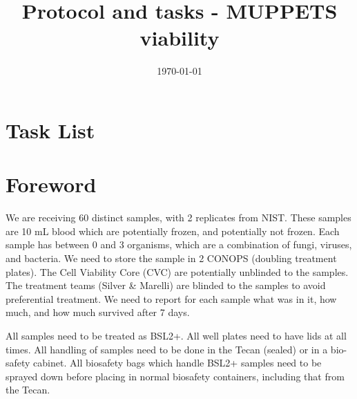\documentclass{article}
\title{Protocol and tasks - MUPPETS viability}
\date{\today}
\begin{document}
\pagestyle{fancy}
\fancyfoot{}
\fancyhead{}

\maketitle
\tableofcontents


\section{Task List}



\newpage

\section{Foreword}
We are receiving 60 distinct samples, with 2 replicates from NIST. These samples are 10 mL blood which are potentially frozen, and potentially not frozen. Each sample has between 0 and 3 organisms, which are a combination of fungi, viruses, and bacteria. We need to store the sample in 2 CONOPS (doubling treatment plates). The Cell Viability Core (CVC) are potentially unblinded to the samples. The treatment teams (Silver \& Marelli) are blinded to the samples to avoid preferential treatment. We need to report for each sample what was in it, how much, and how much survived after 7 days.

All samples need to be treated as BSL2+. All well plates need to have lids at all times. All handling of samples need to be done in the Tecan (sealed) or in a bio-safety cabinet. All biosafety bags which handle BSL2+ samples need to be sprayed down before placing in normal biosafety containers, including that from the Tecan. 
\end{document}
